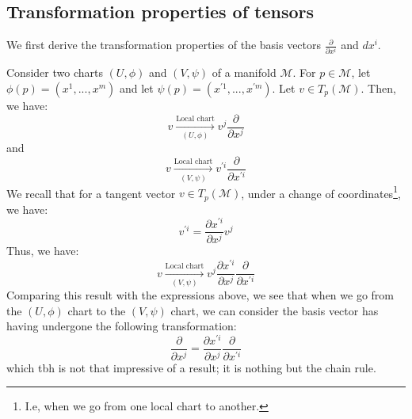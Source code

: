       \subsection{Transformation properties of tensors}
        We first derive the transformation properties of the basis vectors
        $\frac{\partial}{\partial x^i}$ and $dx^i$.

        Consider two charts $(U, \phi)$ and $(V, \psi)$ of a manifold
        $\mathcal{M}$. For $p \in \mathcal{M}$, let $\phi(p) = (x^1,...,x^m)$
        and let $\psi(p) = (x^{\prime 1},...,x^{\prime m})$. Let $v \in
        T_p(\mathcal{M})$. Then, we have:
        \begin{equation*}
          v \xrightarrow[(U,\phi)]{\text{Local chart}} v^j
          \frac{\partial}{\partial x^j}
        \end{equation*}
        and 
        \begin{equation*}
          v \xrightarrow[(V, \psi)]{\text{Local chart}} v^{\prime i}
          \frac{\partial}{\partial x^{\prime i}}
        \end{equation*}
        We recall that for a tangent vector $v \in T_p(\mathcal{M})$, under a
        change of coordinates\footnote{I.e, when we go from one local chart
        to another.}, we have:
          \[v^{\prime i} = \frac{\partial x^{\prime i}}{\partial x^j} v^j\]
        Thus, we have:
        \begin{equation*}
          v \xrightarrow[(V, \psi)]{\text{Local chart}} v^j \frac{\partial
          x^{\prime i}}{\partial x^j} \frac{\partial}{\partial x^{\prime
          i}}
        \end{equation*}
        Comparing this result with the expressions above,
        we see that when we
        go from the $(U,\phi)$ chart to the $(V,\psi)$ chart, we can consider
        the basis vector has having undergone the following transformation:
        \begin{equation}
          \label{eqn: transformation property of basis vector part 3}
            \frac{\partial}{\partial x^j} = \frac{\partial x^{\prime
            i}}{\partial x^j} \frac{\partial}{\partial x^{\prime i}}
        \end{equation}
        which tbh is not that impressive of a result; it is nothing but the
        chain rule.


